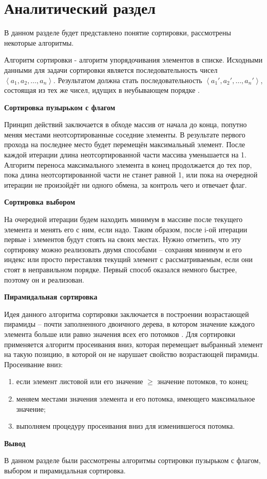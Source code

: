 \chapter{Аналитический раздел}
\label{cha:analysis}
В данном разделе будет представлено понятие сортировки, рассмотрены некоторые алгоритмы.

Алгоритм сортировки - алгоритм упорядочивания элементов в списке. Исходными данными для задачи сортировки является последовательность чисел $\left\langle a_1,a_2,\dots,a_n \right\rangle$. Результатом должна стать последовательность $\left\langle a_1',a_2',\dots,a_n' \right\rangle$, состоящая из тех же чисел, идущих в неубывающем порядке \cite{Cormen}. 

\par\textbf{Сортировка пузырьком с флагом}
\par Принцип действий заключается в обходе массив от начала до конца, попутно меняя местами неотсортированные соседние элементы. В результате первого прохода на последнее место будет перемещён максимальный элемент. После каждой итерации длина неотсортированной части массива уменьшается на 1. Алгоритм переноса максимального элемента в конец продолжается до тех пор, пока длина неотсортированной части не станет равной 1, или пока на очередной итерации не произойдёт ни одного обмена, за контроль чего и отвечает флаг.
\par\textbf{Сортировка выбором}
\par На очередной итерации будем находить минимум в массиве после текущего элемента и менять его с ним, если надо. Таким образом, после i-ой итерации первые i элементов будут стоять на своих местах. Нужно отметить, что эту сортировку можно реализовать двумя способами – сохраняя минимум и его индекс или просто переставляя текущий элемент с рассматриваемым, если они стоят в неправильном порядке. Первый способ оказался немного быстрее, поэтому он и реализован.
\par\textbf{Пирамидальная сортировка}
\par Идея данного алгоритма сортировки заключается в построении возрастающей пирамиды -- почти заполненного двоичного дерева, в котором значение каждого элемента больше или равно значения всех его потомков \cite{archive}. Для сортировки применяется алгоритм просеивания вниз, которая перемещает выбранный элемент на такую позицию, в которой он не нарушает свойство возрастающей пирамиды. Просеивание вниз:
\begin{enumerate}[1)]
	\item если элемент листовой или его значение $\geq$ значение потомков, то конец;
	\item меняем местами значения элемента и его потомка, имеющего максимальное значение;
	\item выполняем процедуру просеивания вниз для изменившегося потомка. 
\end{enumerate}
\par\textbf{Вывод}
\par В данном разделе были рассмотрены алгоритмы сортировки пузырьком с флагом, выбором и пирамидальная сортировка.